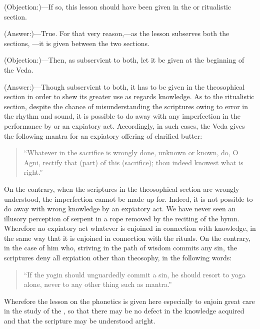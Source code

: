 \documentclass{xminimal}
\begin{document}
(Objection:)—If so, this lesson should have been given in the 
or ritualistic section.

(Answer:)—True. For that very reason,—as the lesson subserves both the sections,
—it is given between the two sections.

(Objection:)—Then, as subservient to both, let it be given at the beginning of
the Veda.

(Answer:)—Though subservient to both, it has to be given in the theosophical
section in order to shew its greater use as regards knowledge. As to
the ritualistic section, despite the chance of misunderstanding the scriptures
owing to error in the rhythm and sound, it is possible to do away with any
imperfection in the performance by  or an expiatory act.
Accordingly, in such cases, the Veda gives the following mantra for an expiatory
offering of clarified butter:

\begin{quote}
  “Whatever in the sacrifice is wrongly done, unknown or known, do, O Agni,
  rectify that (part) of this (sacrifice); thou indeed knowest what is right.”
\end{quote}

On the contrary, when the scriptures in the theosophical section are wrongly
understood, the imperfection cannot be made up for. Indeed, it is not possible
to do away with wrong knowledge by an expiatory act. We have never seen
an illusory perception of serpent in a rope removed by the reciting of
the  hymn. Wherefore no expiatory act whatever is enjoined in
connection with knowledge, in the same way that it is enjoined in connection
with the rituals. On the contrary, in the case of him who, striving in the path
of wisdom commits any sin, the scriptures deny all expiation other than
theosophy, in the following words:

\begin{quote}
  “If the yogin should unguardedly commit a sin, he should resort to yoga alone,
  never to any other thing such as mantra.”
\end{quote}

Wherefore the lesson on the phonetics is given here especially to enjoin great
care in the study of the , so that there may be no defect in
the knowledge acquired and that the scripture may be understood aright.
\end{document}
